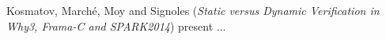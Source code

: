 

Kosmatov, March\'{e}, Moy and Signoles
\cite{isola-2016-kosmatov}
({\em Static versus Dynamic Verification in 
      Why3, Frama-C and SPARK2014})
present ...
